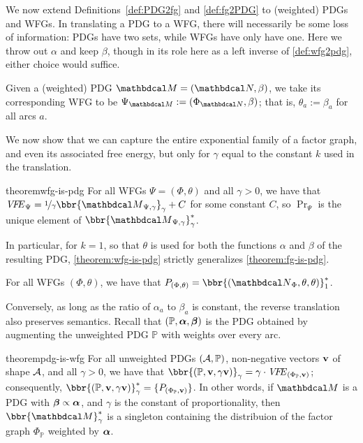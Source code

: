 We now extend Definitions~\ref{def:PDG2fg} and \ref{def:fg2PDG} to
(weighted) PDGs and WFGs.  
In translating a PDG to a WFG, 
there will necessarily be some loss of information: PDGs have two sets, while WFGs have 
only have one. Here we throw out $\alpha$ and keep $\beta$, 
though in its role here as a left inverse of \cref{def:wfg2pdg},
either choice would suffice. 


\begin{defn}
Given a (weighted) PDG $\dg M =
(\dg N, \beta)$, we take its corresponding WFG to be $\WFGof{\dg M} :=
(\FGof{\dg N}, \beta)$; that is, $\theta_a := \beta_a$ for all arcs $a$.
\end{defn}
We now show that we can capture the entire exponential family of a factor graph,
and even its associated free energy, 
but only for $\gamma$ equal to the constant $k$ used in
the translation.  


\begin{linked}{theorem}{wfg-is-pdg}
For all WFGs $\Psi = (\Phi,\theta)$ and all $\gamma > 0$,
we have that
$\VFE_\Psi
= \nicefrac1{\gamma} \bbr{{\dg M}_{\Psi,\gamma}}_{\gamma} 
+ C$   
for some constant $C$, so
$\Pr_{\Psi}$ is the unique element of
$\bbr{{\dg M}_{\Psi,\gamma}}_{\gamma}^*$.
\end{linked}

In particular, for $k\!=\!1$, so that $\theta$ is used for both the functions
$\alpha$ and $\beta$ of the resulting PDG,
\cref{theorem:wfg-is-pdg} strictly generalizes \cref{theorem:fg-is-pdg}.
\begin{coro}
	For all WFGs $(\Phi, \theta)$,
	we have that
	$\Pr_{(\Phi,\theta)} = \bbr{(\UPDGof{\Phi}, \theta,\theta)}_1^*$.
\end{coro}

Conversely, as long as the ratio of $\alpha_a$ to $\beta_a$ is constant, the
reverse translation also preserves semantics.
Recall that $(\mathbb P, \boldsymbol\alpha, \boldsymbol\beta)$ is the PDG obtained by augmenting the unweighted PDG $\mathbb P$ with weights over every arc. 

\begin{linked}{theorem}{pdg-is-wfg}
For all unweighted PDGs $(\mathcal A, \mathbb P)$, non-negative vectors $\mathbf v$
of shape $\mathcal A$, and all $\gamma > 0$, we have that 
$\bbr{(\mathbb P, \mat v, \gamma \mat v)}_{\gamma}
= \gamma\cdot\VFE_{(\Phi_{\mathbb P}, \mat v)} $; consequently,
$\bbr{(\mathbb P,  \mat v,  \gamma\mat v)}_{\gamma}^*
		= \{\Pr_{(\Phi_{\mathbb P}, \mat v)} \}$. 
In other words, if $\dg M$ is a PDG with $\boldsymbol\beta \propto \boldsymbol\alpha$,
and $\gamma$ is the constant of proportionality,
then $\bbr{ \dg M }^*_\gamma$ is a singleton containing the distribuion of the factor graph $\Phi_{\mathbb P}$ weighted by $\boldsymbol\alpha$.  
\end{linked}




